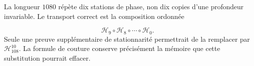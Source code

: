 La longueur \(1080\) répète dix stations de phase, non dix copies
d’une profondeur invariable. Le transport correct est la composition
ordonnée

\[
 \mathcal H_9\circ\mathcal H_8\circ\cdots\circ\mathcal H_0.
\]
Seule une preuve supplémentaire de stationnarité permettrait de la remplacer par
\(\mathcal H_{108}^{10}\). La formule de couture conserve précisément
la mémoire que cette substitution pourrait effacer.

